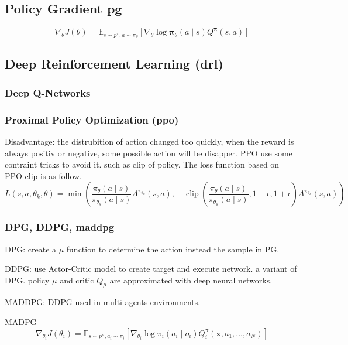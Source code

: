 \subsection{Policy Gradient \gls{pg}}
\begin{equation}
\nabla_{\theta} J(\theta)=\mathbb{E}_{s \sim p^{\pi}, a \sim \pi_{\theta}}\left[\nabla_{\theta} \log \boldsymbol{\pi}_{\theta}(a \mid s) Q^{\boldsymbol{\pi}}(s, a)\right]
\end{equation}

\subsection{Deep Reinforcement Learning (\gls{drl})}
\subsubsection{Deep Q-Networks}

\subsubsection{Proximal Policy Optimization (\gls{ppo})}
Disadvantage: the distrubition of action changed too quickly, when the reward is always positiv or negative, some possible action will be disapper.
PPO use some contraint tricks to avoid it. such as clip of policy. The loss function based on PPO-clip is as follow.
\begin{equation}
L\left(s, a, \theta_{k}, \theta\right)=\min \left(\frac{\pi_{\theta}(a \mid s)}{\pi_{\theta_{k}}(a \mid s)} A^{\pi_{\theta_{k}}}(s, a), \quad \operatorname{clip}\left(\frac{\pi_{\theta}(a \mid s)}{\pi_{\theta_{k}}(a \mid s)}, 1-\epsilon, 1+\epsilon\right) A^{\pi_{\theta_{k}}}(s, a)\right)
\end{equation} 

\subsubsection{DPG, DDPG, \gls{maddpg}}

DPG: create a $\mu$ function to determine the action instead the sample in PG.

DDPG: use Actor-Critic model to create target and execute network. a variant of DPG. policy $\mu$ and critic $Q_\mu$ are approximated with deep neural networks.

MADDPG: DDPG used in multi-agents environments.

MADPG
\begin{equation}
\nabla_{\theta_{i}} J\left(\theta_{i}\right)=\mathbb{E}_{s \sim p^{\mu}, a_{i} \sim \pi_{i}}\left[\nabla_{\theta_{i}} \log \pi_{i}\left(a_{i} \mid o_{i}\right) Q_{i}^{\pi}\left(\mathbf{x}, a_{1}, \ldots, a_{N}\right)\right]
\end{equation}

